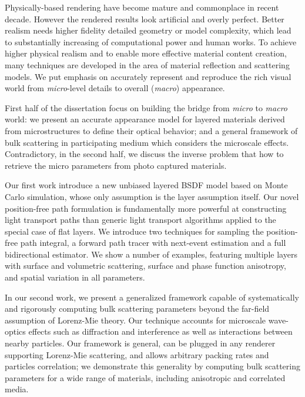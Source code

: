 \thesisabstract
{
  Physically-based rendering have become mature and commonplace in recent decade. However the rendered results look artificial and overly perfect. Better realism needs higher fidelity detailed geometry or model complexity, which lead to substantially increasing of computational power and human works. To achieve higher physical realism and to enable more effective material content creation, many techniques are developed in the area of material reflection and scattering models. We put emphasis on accurately represent and reproduce the rich visual world from \emph{micro}-level details to overall (\emph{macro}) appearance.
  
  First half of the dissertation focus on building the bridge from \emph{micro} to \emph{macro} world: we present an accurate appearance model for layered materials derived from microstructures to define their optical behavior; and a general framework of bulk scattering in participating medium which considers the microscale effects. Contradictory, in the second half, we discuss the inverse problem that how to retrieve the micro parameters from photo captured materials. 
  
  Our first work introduce a new unbiased layered BSDF model based on Monte Carlo simulation, whose only assumption is the layer assumption itself. Our novel position-free path formulation is fundamentally more powerful at constructing light transport paths than generic light transport algorithms applied to the special case of flat layers. We introduce two techniques for sampling the position-free path integral, a forward path tracer with next-event estimation and a full bidirectional estimator. We show a number of examples, featuring multiple layers with surface and volumetric scattering, surface and phase function anisotropy, and spatial variation in all parameters.
  
  In our second work, we present a generalized framework capable of systematically and rigorously computing bulk scattering parameters beyond the far-field assumption of Lorenz-Mie theory. Our technique accounts for microscale wave-optics effects such as diffraction and interference as well as interactions between nearby particles. Our framework is general, can be plugged in any renderer supporting Lorenz-Mie scattering, and allows arbitrary packing rates and particles correlation; we demonstrate this generality by computing bulk scattering parameters for a wide range of materials, including anisotropic and correlated media.
  
}
